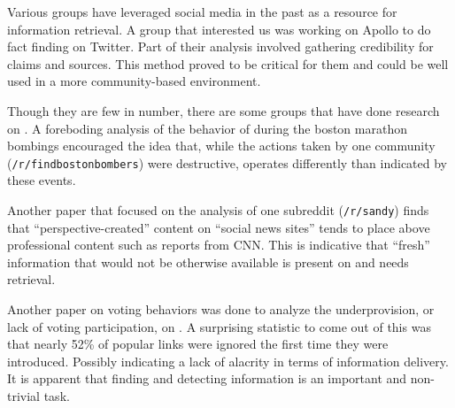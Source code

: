 Various groups have leveraged social media in the past as a resource for
information retrieval. A group that interested us was working on Apollo to do
fact finding on Twitter. Part of their analysis involved gathering credibility
for claims and sources.\cite{Le:2011:DDL:2070942.2071018} This method proved to
be critical for them and could be well used in a more community-based
environment.


Though they are few in number, there are some groups that have done research on
\reddit{}. A foreboding analysis of the behavior of \reddit{} during the boston
marathon bombings encouraged the idea that, while the actions taken by one
community (\texttt{/r/findbostonbombers}) were destructive, \reddit{} operates
differently than indicated by these events.
\cite{Potts:2013:IRC:2507065.2507079}

Another paper that focused on the analysis of one subreddit (\texttt{/r/sandy})
finds that ``perspective-created'' content on ``social news sites'' tends to
place above professional content such as reports from CNN.
\cite{Leavitt:2014:UHS:2556288.2557140} This is indicative that ``fresh''
information that would not be otherwise available is present on \reddit{} and
needs retrieval.

Another paper on voting behaviors was done to analyze the underprovision, or
lack of voting participation, on \reddit{}. A surprising statistic to come out
of this was that nearly 52\% of popular links were ignored the first time they
were introduced.\cite{Gilbert:2013:WUR:2441776.2441866} Possibly indicating a
lack of alacrity in terms of information delivery. It is apparent that finding
and detecting information is an important and non-trivial task.
